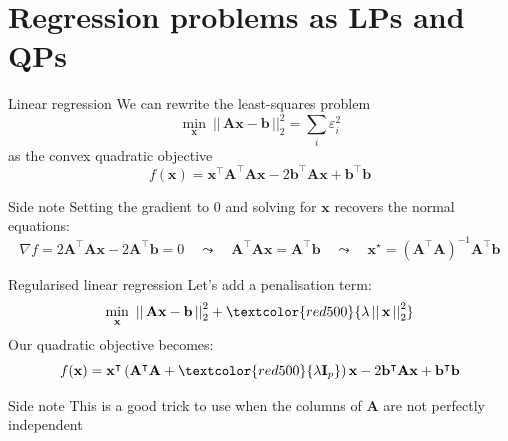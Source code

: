 \documentclass[16pt,aspectratio=169]{beamer}
\renewcommand{\vec}[1]{\ensuremath{\mathbf{#1}}}
\newcommand{\mat}[1]{\ensuremath{\vec{#1}}}
\newcommand{\tr}{\ensuremath{\intercal}}
\begin{document}
\section{Regression problems as LPs and QPs}

\begin{frame}{Linear regression}
    We can rewrite the least\hyp{}squares problem
    \[
        \min_{\vec{x}} \ \left|\left|\,\mat{A}\vec{x} - \vec{b}\,\right|\right|_{2}^{2}
        = \sum_{i} \varepsilon_{i}^{2}
    \]
    as the convex quadratic objective
    \[
        f(\vec{x}) = \vec{x}^{\tr} \mat{A}^{\tr} \mat{A} \vec{x} - 2 \vec{b}^{\tr} \mat{A} \vec{x} + \vec{b}^{\tr} \vec{b}
    \]
    \vfill
    \begin{block}{Side note}
        Setting the gradient to 0 and solving for $\vec{x}$ recovers the normal
        equations:
        \[
            \nabla f = 2 \mat{A}^{\tr} \mat{A} \vec{x} - 2 \mat{A}^{\tr} \vec{b} = 0
            \quad\leadsto\quad
            \mat{A}^{\tr} \mat{A} \vec{x} = \mat{A}^{\tr} \vec{b}
            \quad\leadsto\quad
            \vec{x}^{\star} = \left( \mat{A}^{\tr} \mat{A} \right)^{-1} \mat{A}^{\tr} \vec{b}
        \]
    \end{block}
\end{frame}

\begin{frame}{Regularised linear regression}
    Let's add a penalisation term:
    \[
        \min_{\vec{x}} \ \left|\left|\,\mat{A}\vec{x} - \vec{b}\,\right|\right|_{2}^{2}
        + \textcolor{red500}{\lambda \left|\left|\, \vec{x} \,\right|\right|_{2}^{2}}
    \]
    Our quadratic objective becomes:
    \[
        f(\vec{x}) = \vec{x}^{\tr} \left( \mat{A}^{\tr} \mat{A} + \textcolor{red500}{\lambda \mat{I}_{p}} \right) \vec{x} - 2 \vec{b}^{\tr} \mat{A} \vec{x} + \vec{b}^{\tr} \vec{b}
    \]
    \vfill
    \begin{block}{Side note}
        This is a good trick to use when the columns of $\mat{A}$ are not
        perfectly independent
    \end{block}
\end{frame}
\end{document}
